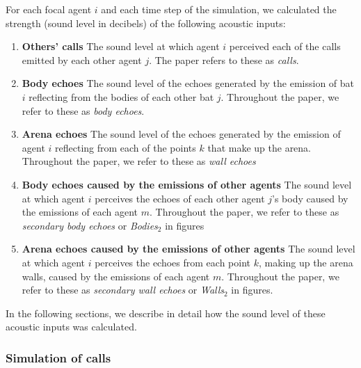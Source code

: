 \documentclass[a4paper, 11pt]{article}
\begin{document}
For each focal agent $i$ and each time step of the simulation, we calculated the strength (sound level in decibels) of the following acoustic inputs: 
%
\begin{enumerate} 
    \item \textbf{Others' calls} The sound level at which agent $i$ perceived each of the calls emitted by each other agent $j$. The paper refers to these as \emph{calls}.
    \item \textbf{Body echoes} The sound level of the echoes generated by the emission of bat $i$ reflecting from the bodies of each other bat $j$. Throughout the paper, we refer to these as \emph{body echoes}.
    \item \textbf{Arena echoes} The sound level of the echoes generated by the emission of agent $i$ reflecting from each of the points $k$ that make up the arena. Throughout the paper, we refer to these as \emph{wall echoes}
    \item \textbf{Body echoes caused by the emissions of other agents} The sound level at which agent $i$ perceives the echoes of each other agent $j$'s body caused by the emissions of each agent  $m$. Throughout the paper, we refer to these as \emph{secondary body echoes} or \emph{Bodies$_2$} in figures
    \item \textbf{Arena echoes caused by the emissions of other agents} The sound level at which agent $i$ perceives the echoes from each point $k$, making up the arena walls, caused by the emissions of each agent $m$. Throughout the paper, we refer to these as \emph{secondary wall echoes} or \emph{Walls$_2$} in figures.
\end{enumerate}
%
In the following sections, we describe in detail how the sound level of these acoustic inputs was calculated.

\subsubsection{Simulation of calls}
\end{document}
